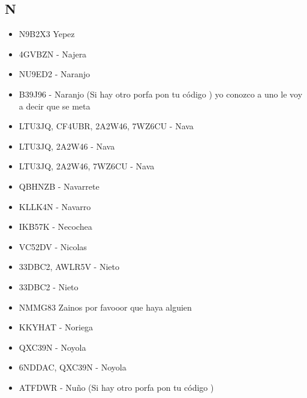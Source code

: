 \subsection*{N}
\begin{itemize}[leftmargin=*,nosep]
\item N9B2X3 Yepez
\item 4GVBZN - Najera
\item NU9ED2 - Naranjo
\item B39J96 - Naranjo (Si hay otro porfa pon tu código ) yo conozco a uno le voy a decir que se meta
\item LTU3JQ, CF4UBR, 2A2W46, 7WZ6CU - Nava
\item LTU3JQ, 2A2W46  -  Nava
\item LTU3JQ, 2A2W46, 7WZ6CU - Nava
\item QBHNZB - Navarrete
\item KLLK4N - Navarro
\item IKB57K  -  Necochea
\item VC52DV - Nicolas
\item 33DBC2, AWLR5V - Nieto
\item 33DBC2 - Nieto
\item NMMG83 Zainos por favooor que haya alguien
\item KKYHAT - Noriega
\item QXC39N - Noyola
\item 6NDDAC, QXC39N - Noyola
\item ATFDWR  -  Nuño (Si hay otro porfa pon tu código )
\end{itemize}

